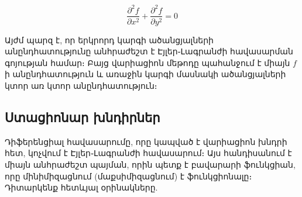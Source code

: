 \documentclass[fleqn, bachelor,subf,12pt,notitlepage]{article}
\begin{document}
$$\dfrac{\partial^{2}f}{\partial x^{2}} + \dfrac{\partial^{2}f}{\partial y^{2}} = 0$$


Այժմ պարզ է, որ երկրորդ կարգի ածանցյալների անընդհատությունը անհրաժեշտ է Էյլեր֊Լագրանժի հավասարման գոյության համար։ Բայց վարիացիոն մեթոդը պահանջում է միայն $f$ ի անընդհատություն և առաջին կարգի մասնակի ածանցյալների կտոր առ կտոր անընդհատություն։

\subsection*{Ստացիոնար խնդիրներ} %

Դիֆերենցիալ հավասարումը, որը կապված է վարիացիոն խնդրի հետ, կոչվում է Էյլեր֊Լագրանժի հավասարում։ Այս հանդիսանում է միայն անհրաժեշտ պայման, որին պետք է բավարարի ֆունկցիան, որը մինիմիզացնում (մաքսիմիզացնում) է ֆունկցիոնալը։ 
Դիտարկենք հետևյալ օրինակները.
\end{document}
